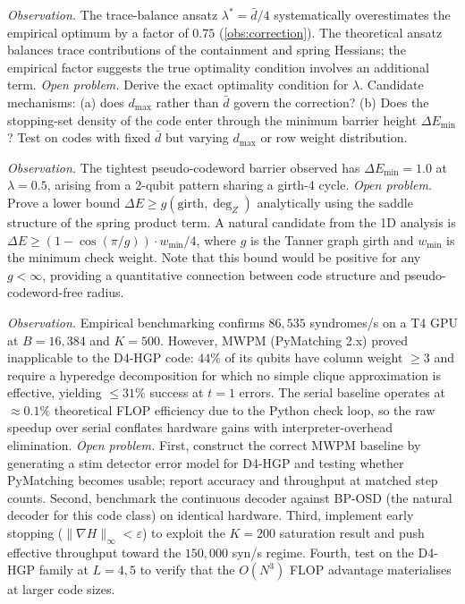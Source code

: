 \documentclass[12pt,a4paper]{article}
\theoremstyle{plain}
\theoremstyle{definition}
\theoremstyle{remark}
\newcommand{\dZ}{\operatorname{deg}_Z}
\begin{document}
\begin{description}[style=nextline]
\item[(O4$'$) Analytic derivation of the $0.75\times$ $\lambda^*$ correction.]
\emph{Observation.}
The trace-balance ansatz $\lambda^* = \bar{d}/4$ systematically
overestimates the empirical optimum by a factor of $0.75$
(\cref{obs:correction}).
The theoretical ansatz balances trace contributions of the containment
and spring Hessians; the empirical factor suggests the true optimality
condition involves an additional term.
\emph{Open problem.}
Derive the exact optimality condition for $\lambda$.
Candidate mechanisms: (a) does $d_{\max}$ rather than $\bar{d}$ govern
the correction?
(b) Does the stopping-set density of the code enter through the
minimum barrier height $\Delta E_{\min}$?
Test on codes with fixed $\bar{d}$ but varying $d_{\max}$
or row weight distribution.

\item[(O1$'$) Analytic lower bound on $\Delta E_{\min}$.]
\emph{Observation.}
The tightest pseudo-codeword barrier observed has $\Delta E_{\min} = 1.0$
at $\lambda=0.5$, arising from a 2-qubit pattern sharing a girth-4 cycle.
\emph{Open problem.}
Prove a lower bound $\Delta E \geq g(\text{girth},\dZ)$ analytically
using the saddle structure of the spring product term.
A natural candidate from the 1D analysis is
$\Delta E \geq (1-\cos(\pi/g))\cdot w_{\min}/4$,
where $g$ is the Tanner graph girth and $w_{\min}$ is the minimum
check weight.
Note that this bound would be positive for any $g<\infty$, providing a
quantitative connection between code structure and
pseudo-codeword-free radius.

\item[(O5$'$) Hardware-normalised throughput comparison.]
\emph{Observation.}
Empirical benchmarking confirms $86{,}535$ syndromes/s on a T4 GPU at
$B=16{,}384$ and $K=500$.
However, MWPM (PyMatching 2.x) proved inapplicable to the D4-HGP code:
$44\%$ of its qubits have column weight $\geq 3$ and require a hyperedge
decomposition for which no simple clique approximation is effective,
yielding $\leq 31\%$ success at $t=1$ errors.
The serial baseline operates at $\approx 0.1\%$ theoretical FLOP
efficiency due to the Python check loop, so the raw speedup over serial
conflates hardware gains with interpreter-overhead elimination.
\emph{Open problem.}
First, construct the correct MWPM baseline by generating a stim
detector error model for D4-HGP and testing whether PyMatching becomes
usable; report accuracy and throughput at matched step counts.
Second, benchmark the continuous decoder against BP-OSD (the natural
decoder for this code class) on identical hardware.
Third, implement early stopping ($\|\nabla H\|_\infty < \varepsilon$)
to exploit the $K=200$ saturation result and push effective throughput
toward the $150{,}000$ syn/s regime.
Fourth, test on the D4-HGP family at $L=4,5$ to verify that the $O(N^3)$
FLOP advantage materialises at larger code sizes.


\end{description}
\end{document}
